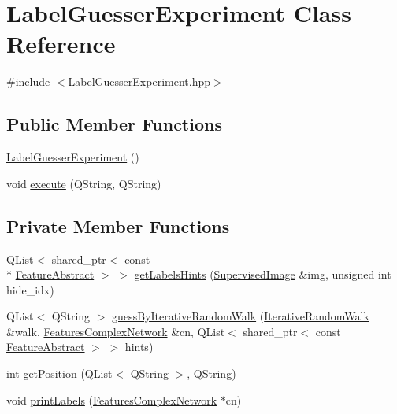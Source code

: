 \hypertarget{class_label_guesser_experiment}{\section{Label\+Guesser\+Experiment Class Reference}
\label{class_label_guesser_experiment}
}


{\ttfamily \#include $<$Label\+Guesser\+Experiment.\+hpp$>$}

\subsection*{Public Member Functions}
\begin{DoxyCompactItemize}
\item 
\hyperlink{class_label_guesser_experiment_a7977b88b6e11448ed975f4b9cea368dc}{Label\+Guesser\+Experiment} ()
\item 
void \hyperlink{class_label_guesser_experiment_ac59f249adb0e74044f30f2847006743f}{execute} (Q\+String, Q\+String)
\end{DoxyCompactItemize}
\subsection*{Private Member Functions}
\begin{DoxyCompactItemize}
\item 
Q\+List$<$ shared\+\_\+ptr$<$ const \\*
\hyperlink{class_feature_abstract}{Feature\+Abstract} $>$ $>$ \hyperlink{class_label_guesser_experiment_aff519caff30a7cfe4962b6645788577c}{get\+Labels\+Hints} (\hyperlink{class_supervised_image}{Supervised\+Image} \&img, unsigned int hide\+\_\+idx)
\item 
Q\+List$<$ Q\+String $>$ \hyperlink{class_label_guesser_experiment_a0305abdcc36d592d5e92187b35be9169}{guess\+By\+Iterative\+Random\+Walk} (\hyperlink{class_iterative_random_walk}{Iterative\+Random\+Walk} \&walk, \hyperlink{class_features_complex_network}{Features\+Complex\+Network} \&cn, Q\+List$<$ shared\+\_\+ptr$<$ const \hyperlink{class_feature_abstract}{Feature\+Abstract} $>$ $>$ hints)
\item 
int \hyperlink{class_label_guesser_experiment_ae0a57bb59569d9bc69363a68f888f646}{get\+Position} (Q\+List$<$ Q\+String $>$, Q\+String)
\item 
void \hyperlink{class_label_guesser_experiment_a835363da6b06ec1402823493ef933179}{print\+Labels} (\hyperlink{class_features_complex_network}{Features\+Complex\+Network} $\ast$cn)
\end{DoxyCompactItemize}


